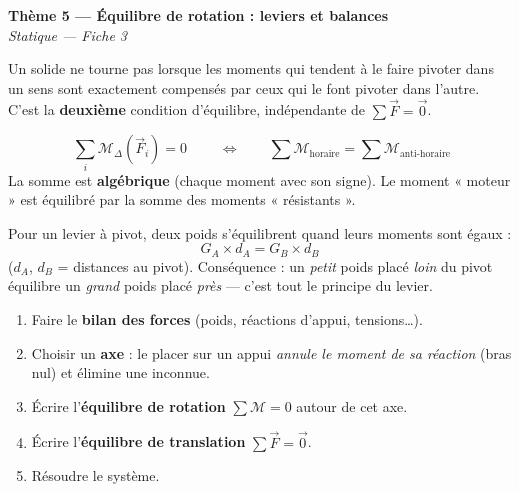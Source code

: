 \documentclass[11pt,a4paper]{article}
\newcommand{\vv}[1]{\vec{#1}}\newcommand{\ds}{\displaystyle}
\begin{document}
\begin{center}
{\LARGE\bfseries\color{primarydark}Thème 5 — Équilibre de rotation : leviers et balances}\\[2pt]
{\color{primary}\itshape Statique — Fiche 3}
\end{center}
\vspace{1mm}

Un solide ne tourne pas lorsque les moments qui tendent à le faire pivoter dans un sens sont
exactement compensés par ceux qui le font pivoter dans l'autre. C'est la \textbf{deuxième} condition
d'équilibre, indépendante de $\sum\vv F=\vv 0$.

\begin{cle}
\[
\boxed{\;\sum_i \mathcal{M}_\Delta(\vv F_i) = 0\;}
\qquad\Longleftrightarrow\qquad
\sum \mathcal{M}_{\text{horaire}} = \sum \mathcal{M}_{\text{anti-horaire}}
\]
La somme est \textbf{algébrique} (chaque moment avec son signe). Le moment « moteur » est équilibré
par la somme des moments « résistants ».
\end{cle}

\begin{cle}[le levier]
Pour un levier à pivot, deux poids s'équilibrent quand leurs moments sont égaux :
\[
\boxed{\;G_A\times d_A = G_B\times d_B\;}
\]
($d_A$, $d_B$ = distances au pivot). Conséquence : un \emph{petit} poids placé \emph{loin} du pivot
équilibre un \emph{grand} poids placé \emph{près} — c'est tout le principe du levier.
\end{cle}

\begin{methode}
\begin{enumerate}[leftmargin=1.6em,topsep=1pt,itemsep=1pt]
  \item Faire le \textbf{bilan des forces} (poids, réactions d'appui, tensions\dots).
  \item Choisir un \textbf{axe} : le placer sur un appui \emph{annule le moment de sa réaction}
        (bras nul) et élimine une inconnue.
  \item Écrire l'\textbf{équilibre de rotation} $\sum\mathcal{M}=0$ autour de cet axe.
  \item Écrire l'\textbf{équilibre de translation} $\sum\vv F=\vv 0$.
  \item Résoudre le système.
\end{enumerate}
\end{methode}
\end{document}
